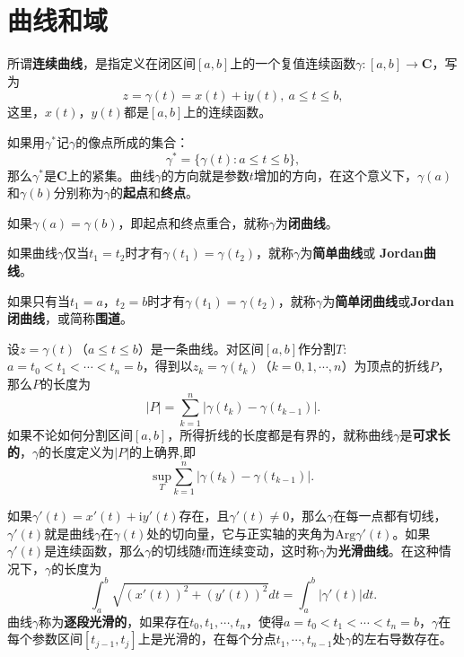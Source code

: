 \documentclass[../../main.tex]{subfiles}
\begin{document}
\section{曲线和域}

\begin{definition}[连续曲线]
所谓\textbf{连续曲线}，是指定义在闭区间\([a, b]\)上的一个复值连续函数\(\gamma: [a, b] \to \mathbf{C}\)，写为
\[
z = \gamma(t) = x(t) + \mathrm{i}y(t), \ a \leqslant t \leqslant b,
\]
这里，\(x(t)\)，\(y(t)\)都是\([a, b]\)上的连续函数。

如果用\(\gamma^*\)记\(\gamma\)的像点所成的集合：
\[
\gamma^* = \{ \gamma(t) : a \leqslant t \leqslant b \},
\]
那么\(\gamma^*\)是\(\mathbf{C}\)上的紧集。曲线\(\gamma\)的方向就是参数\(t\)增加的方向，在这个意义下，\(\gamma(a)\)和\(\gamma(b)\)分别称为\(\gamma\)的\textbf{起点}和\textbf{终点}。

如果\(\gamma(a) = \gamma(b)\)，即起点和终点重合，就称\(\gamma\)为\textbf{闭曲线}。

如果曲线\(\gamma\)仅当\(t_1 = t_2\)时才有\(\gamma(t_1) = \gamma(t_2)\)，就称\(\gamma\)为\textbf{简单曲线}或 \textbf{Jordan曲线}。

如果只有当\(t_1 = a\)，\(t_2 = b\)时才有\(\gamma(t_1) = \gamma(t_2)\)，就称\(\gamma\)为\textbf{简单闭曲线}或\textbf{Jordan闭曲线}，或简称\textbf{围道}。
\end{definition}

\begin{definition}\label{definition:复平面上的光滑曲线}
设\(z = \gamma(t)\)（\(a \leqslant t \leqslant b\)）是一条曲线。对区间\([a, b]\)作分割$T:$ \(a = t_0 < t_1 < \cdots < t_n = b\)，得到以\(z_k = \gamma(t_k)\)（\(k = 0, 1, \cdots, n\)）为顶点的折线\(P\)，那么\(P\)的长度为
\[
|P| = \sum_{k = 1}^n | \gamma(t_k) - \gamma(t_{k - 1}) |.
\]
如果不论如何分割区间\([a, b]\)，所得折线的长度都是有界的，就称曲线\(\gamma\)是\textbf{可求长的}，\(\gamma\)的长度定义为\(|P|\)的上确界,即$$\underset{T}{\mathrm{sup}}\sum_{k=1}^n{|\gamma (t_k)}-\gamma (t_{k-1})|.$$

如果\(\gamma'(t) = x'(t) + \mathrm{i}y'(t)\)存在，且\(\gamma'(t) \neq 0\)，那么\(\gamma\)在每一点都有切线，\(\gamma'(t)\)就是曲线\(\gamma\)在\(\gamma(t)\)处的切向量，它与正实轴的夹角为\(\mathrm{Arg}\gamma'(t)\)。如果\(\gamma'(t)\)是连续函数，那么\(\gamma\)的切线随\(t\)而连续变动，这时称\(\gamma\)为\textbf{光滑曲线}。在这种情况下，\(\gamma\)的长度为
\[
\int_a^b \sqrt{(x'(t))^2 + (y'(t))^2} dt = \int_a^b | \gamma'(t) | dt.
\]
曲线\(\gamma\)称为\textbf{逐段光滑的}，如果存在\(t_0, t_1, \cdots, t_n\)，使得\(a = t_0 < t_1 < \cdots < t_n = b\)，\(\gamma\)在每个参数区间\([t_{j - 1}, t_j]\)上是光滑的，在每个分点\(t_1, \cdots, t_{n - 1}\)处\(\gamma\)的左右导数存在。
\end{definition}
\end{document}
